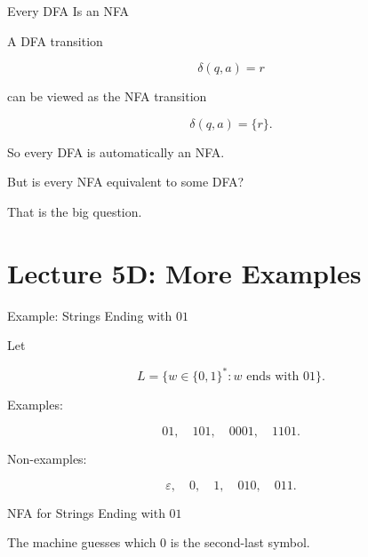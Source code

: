 \documentclass[10pt,aspectratio=169]{beamer}
\newcommand{\eps}{\varepsilon}
\begin{document}
\begin{frame}{Every DFA Is an NFA}

A DFA transition

\[
\delta(q,a)=r
\]

can be viewed as the NFA transition

\[
\delta(q,a)=\{r\}.
\]

\vspace{1em}

So every DFA is automatically an NFA.

\pause

\vspace{1em}

But is every NFA equivalent to some DFA?

That is the big question.

\end{frame}

\section{Lecture 5D: More Examples}

\begin{frame}{Example: Strings Ending with \(01\)}

Let

\[
L=\{w\in\{0,1\}^*: w \text{ ends with }01\}.
\]

Examples:

\[
01,\quad 101,\quad 0001,\quad 1101.
\]

Non-examples:

\[
\eps,\quad 0,\quad 1,\quad 010,\quad 011.
\]

\end{frame}

\begin{frame}{NFA for Strings Ending with \(01\)}

\begin{center}
\end{center}

\vspace{0.5em}

The machine guesses which \(0\) is the second-last symbol.

\end{frame}
\end{document}
